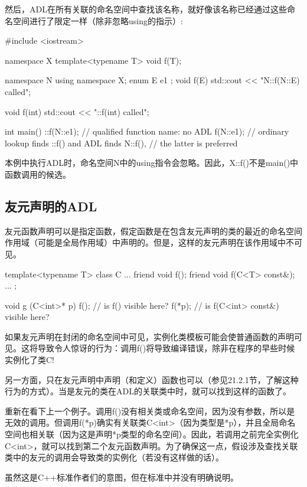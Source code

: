 然后，ADL在所有关联的命名空间中查找该名称，就好像该名称已经通过这些命名空间进行了限定一样（除非忽略using的指示）:

\begin{cpp}
#include <iostream>

namespace X {
	template<typename T> void f(T);
}

namespace N {
	using namespace X;
	enum E { e1 };
	void f(E) {
		std::cout << "N::f(N::E) called\n";
	}
}

void f(int) {
	std::cout << "::f(int) called\n";
}

int main() {
	::f(N::e1); // qualified function name: no ADL
	f(N::e1); // ordinary lookup finds ::f() and ADL finds N::f(),
} // the latter is preferred
\end{cpp}

本例中执行ADL时，命名空间N中的using指令会忽略。因此，X::f()不是main()中函数调用的候选。

\subsection{友元声明的ADL}

友元函数声明可以是指定函数，假定函数是在包含友元声明的类的最近的命名空间作用域（可能是全局作用域）中声明的。但是，这样的友元声明在该作用域中不可见。

\begin{cpp}
template<typename T>
class C {
	...
	friend void f();
	friend void f(C<T> const&);
	...
};

void g (C<int>* p) {
	f(); // is f() visible here?
	f(*p); // is f(C<int> const&) visible here?
}
\end{cpp}

如果友元声明在封闭的命名空间中可见，实例化类模板可能会使普通函数的声明可见。这将导致令人惊讶的行为：调用f()将导致编译错误，除非在程序的早些时候实例化了类C!

另一方面，只在友元声明中声明（和定义）函数也可以（参见21.2.1节，了解这种行为的方式）。当是友元的类在ADL的关联类中时，就可以找到这样的函数了。

重新在看下上一个例子。调用f()没有相关类或命名空间，因为没有参数，所以是无效的调用。但调用f(*p)确实有关联类C<int>（因为类型是*p），并且全局命名空间也相关联（因为这是声明*p类型的命名空间）。因此，若调用之前完全实例化C<int>，就可以找到第二个友元函数声明。为了确保这一点，假设涉及查找关联类中的友元的调用会导致类的实例化（若没有这样做的话）。

\begin{notice}
虽然这是C++标准作者们的意图，但在标准中并没有明确说明。
\end{notice}

